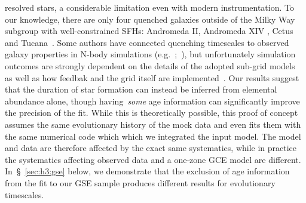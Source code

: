 \documentclass[ms.tex]{subfiles}
\begin{document}
resolved stars, a considerable limitation even with modern instrumentation.
To our knowledge, there are only four quenched galaxies outside of the Milky
Way subgroup with well-constrained SFHs: Andromeda II, Andromeda XIV
\citep{Weisz2014a}, Cetus~\citep{Monelli2010a} and Tucana~\citep{Monelli2010b}.
Some authors have connected quenching timescales to observed galaxy properties
in N-body simulations (e.g.~\citealp*{Rocha2012};~\citealp{Slater2013,
Slater2014, Phillips2014, Phillips2015, Wheeler2014}), but unfortunately
simulation outcomes are strongly dependent on the details of the adopted
sub-grid models~\citep[e.g.][]{Li2020} as well as how feedbak and the grid
itself are implemented~\citep{Hu2022}.
Our results suggest that the duration of star formation can instead be inferred
from elemental abundance alone, though having~\textit{some} age information can
significantly improve the precision of the fit.
While this is theoretically possible, this proof of concept assumes the same
evolutionary history of the mock data and even fits them with the same
numerical code which which we integrated the input model.
The model and data are therefore affected by the exact same systematics, while
in practice the systematics affecting observed data and a one-zone GCE model
are different.
In~\S~\ref{sec:h3:gse} below, we demonstrate that the exclusion of age
information from the fit to our GSE sample produces different results for
evolutionary timescales.
\end{document}
